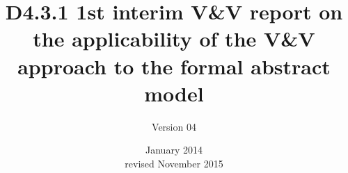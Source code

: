 \documentclass{template/openetcs_report}
\begin{document}
\frontmatter
{}




\title{D4.3.1 1st interim V\&V report on the applicability of the V\&V approach to the formal abstract model}

\subtitle{Version 04}

\date{January 2014\\revised November 2015 }

\creatorname{}                                                                                                                                
\creatoraffil{}                                                                                                                                                                                                                                                                                   
\techassessorname{}                                                                                                                       
\techassessoraffil{}                                                                                                                                                                                                                                                                        
\qualityassessorname{}                                                                                                                       
\qualityassessoraffil{}                                                                                                                      
                                                                                                                                                            
\end{document}
